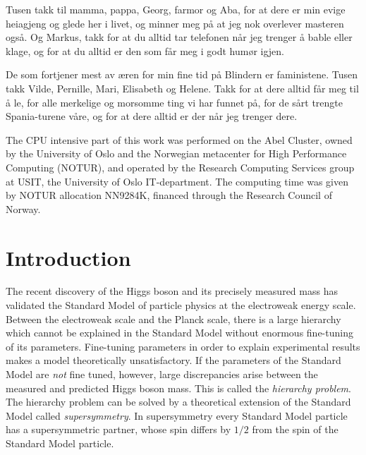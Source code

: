 \documentclass[twoside,english]{uiofysmaster}
\begin{document}
Tusen takk til mamma, pappa, Georg, farmor og Aba, for at dere er min evige heiagjeng og glede her i livet, og minner meg p{\aa} at jeg nok overlever masteren ogs{\aa}. Og Markus, takk for at du alltid tar telefonen n{\aa}r jeg trenger {\aa} bable eller klage, og for at du alltid er den som f{\aa}r meg i godt hum{\o}r igjen.

De som fortjener mest av {\ae}ren for min fine tid p{\aa} Blindern er faministene. Tusen takk Vilde, Pernille, Mari, Elisabeth og Helene. Takk for at dere alltid f{\aa}r meg til {\aa} le, for alle merkelige og morsomme ting vi har funnet p{\aa}, for de s{\aa}rt trengte Spania-turene v{\aa}re, og for at dere alltid er der n{\aa}r jeg trenger dere. 

The CPU intensive part of this work was performed on the Abel Cluster, owned by the University of Oslo and the Norwegian metacenter for High Performance Computing (NOTUR), and operated by the Research Computing Services group at USIT, the University of Oslo IT-department. The computing time was given by NOTUR allocation NN9284K, financed through the Research Council of Norway.




\tableofcontents

\listoffigures

\chapter*{Introduction}

The recent discovery of the Higgs boson \cite{Aad:2012tfa, Chatrchyan:2012xdj} and its precisely measured mass has validated the Standard Model of particle physics at the electroweak energy scale. Between the electroweak scale and the Planck scale, there is a large hierarchy which cannot be explained in the Standard Model without enormous fine-tuning of its parameters. Fine-tuning parameters in order to explain experimental results makes a model theoretically unsatisfactory. If the parameters of the Standard Model are \textit{not} fine tuned, however, large discrepancies arise between the measured and predicted Higgs boson mass. This is called the \textit{hierarchy problem}. The hierarchy problem can be solved by a theoretical extension of the Standard Model called \textit{supersymmetry}. In supersymmetry every Standard Model particle has a supersymmetric partner, whose spin differs by $1/2$ from the spin of the Standard Model particle. 
\end{document}
